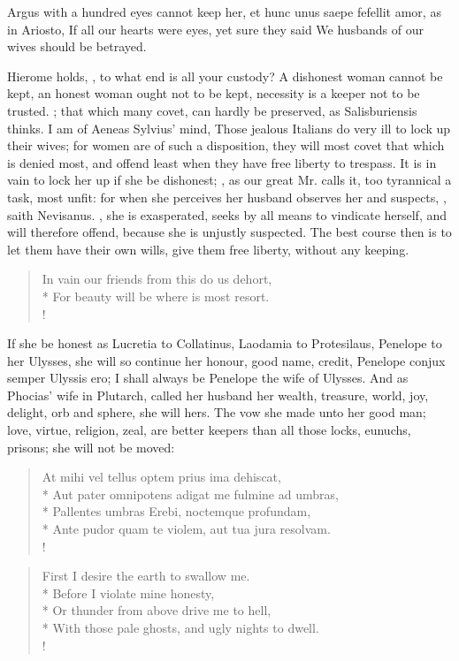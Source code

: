 Argus with a hundred eyes cannot keep her, et hunc unus saepe fefellit
amor, as in Ariosto,
If all our hearts were eyes, yet sure they said
We husbands of our wives should be betrayed.

Hierome holds, , to what end is all your
custody? A dishonest woman cannot be kept, an honest woman ought not to
be kept, necessity is a keeper not to be trusted. ; that which many covet, can hardly be preserved, as
 Salisburiensis thinks. I am of Aeneas Sylvius' mind, Those
jealous Italians do very ill to lock up their wives; for women are of
such a disposition, they will most covet that which is denied most, and
offend least when they have free liberty to trespass. It is in vain to lock her
up if she be dishonest; , as our great Mr.
\Aristotle calls it, too tyrannical a task, most unfit: for when she perceives
her husband observes her and suspects, , saith
Nevisanus. , she is exasperated, seeks by all means to vindicate
herself, and will therefore offend, because she is unjustly suspected. The best
course then is to let them have their own wills, give them free liberty,
without any keeping.
%
\begin{verse}%
In vain our friends from this do us dehort,\\*
For beauty will be where is most resort.\\!
\end{verse}%
%
If she be honest as Lucretia to Collatinus, Laodamia to Protesilaus,
Penelope to her Ulysses, she will so continue her honour, good name,
credit, Penelope conjux semper Ulyssis ero; I shall always be Penelope
the wife of Ulysses. And as Phocias' wife in Plutarch, called her
husband her wealth, treasure, world, joy, delight, orb and sphere, she
will hers. The vow she made unto her good man; love, virtue, religion,
zeal, are better keepers than all those locks, eunuchs, prisons; she
will not be moved:
%
\begin{latin}%
\begin{verse}%
At mihi vel tellus optem prius ima dehiscat,\\*
Aut pater omnipotens adigat me fulmine ad umbras,\\*
Pallentes umbras Erebi, noctemque profundam,\\*
Ante pudor quam te violem, aut tua jura resolvam.\\!
\end{verse}%
\end{latin}%
\translationrule%
\begin{verse}%
First I desire the earth to swallow me.\\*
Before I violate mine honesty,\\*
Or thunder from above drive me to hell,\\*
With those pale ghosts, and ugly nights to dwell.\\!
\end{verse}%
%

